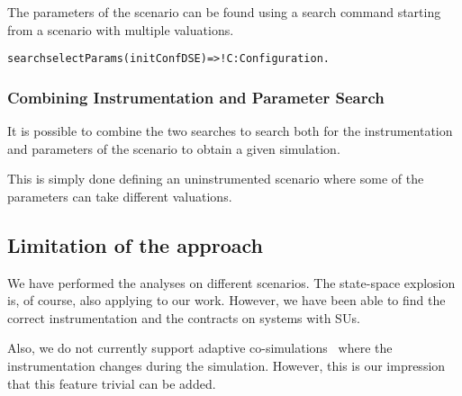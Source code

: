 The parameters of the scenario can be found using a search command starting from a scenario with multiple valuations.
\begin{alltt}
  \small
  search selectParams(initConfDSE)  =>! C:Configuration .
\end{alltt}

\subsubsection{Combining Instrumentation and Parameter Search}
It is possible to combine the two searches to search both for the instrumentation and parameters of the scenario to obtain a given simulation.

This is simply done defining an uninstrumented scenario where some of the parameters can take different valuations.


\subsection{Limitation of the approach}
We have performed the analyses on different scenarios. 
The state-space explosion is, of course, also applying to our work. 
However, we have been able to find the correct instrumentation and the contracts on systems with  SUs.

Also, we do not currently support adaptive co-simulations~\cite{Inci2021} where the instrumentation changes during the simulation. 
However, this is our impression that this feature trivial can be added.